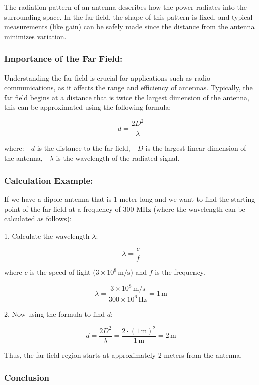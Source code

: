 The radiation pattern of an antenna describes how the power radiates into the surrounding space. In the far field, the shape of this pattern is fixed, and typical measurements (like gain) can be safely made since the distance from the antenna minimizes variation. 

\subsubsection*{Importance of the Far Field:}

Understanding the far field is crucial for applications such as radio communications, as it affects the range and efficiency of antennas. Typically, the far field begins at a distance that is twice the largest dimension of the antenna, this can be approximated using the following formula:

\[
d = \frac{2D^2}{\lambda}
\]

where:
- \( d \) is the distance to the far field,
- \( D \) is the largest linear dimension of the antenna,
- \( \lambda \) is the wavelength of the radiated signal.

\subsubsection*{Calculation Example:}

If we have a dipole antenna that is 1 meter long and we want to find the starting point of the far field at a frequency of 300 MHz (where the wavelength can be calculated as follows):

1. Calculate the wavelength \( \lambda \):

\[
\lambda = \frac{c}{f}
\]

where \( c \) is the speed of light (\(3 \times 10^8\, \text{m/s}\)) and \( f \) is the frequency. 

\[
\lambda = \frac{3 \times 10^8\, \text{m/s}}{300 \times 10^6\, \text{Hz}} = 1\, \text{m}
\]

2. Now using the formula to find \( d \):

\[
d = \frac{2D^2}{\lambda} = \frac{2 \cdot (1\, \text{m})^2}{1\, \text{m}} = 2\, \text{m}
\]

Thus, the far field region starts at approximately 2 meters from the antenna.

\subsubsection{Conclusion}

